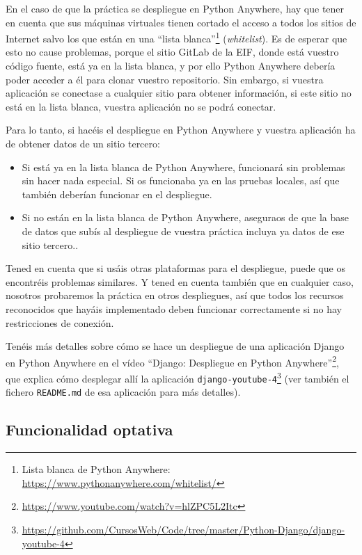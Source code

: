 En el caso de que la práctica se despliegue en Python Anywhere, hay que tener en cuenta que sus máquinas virtuales tienen cortado el acceso a todos los sitios de Internet salvo los que están en una ``lista blanca''\footnote{Lista blanca de Python Anywhere: \url{https://www.pythonanywhere.com/whitelist/}} (\emph{whitelist}). Es de esperar que esto no cause problemas, porque el sitio GitLab de la EIF, donde está vuestro código fuente, está ya en la lista blanca, y por ello Python Anywhere debería poder acceder a él para clonar vuestro repositorio. Sin embargo, si vuestra aplicación se conectase a cualquier sitio para obtener información, si este sitio no está en la lista blanca, vuestra aplicación no se podrá conectar.

Para lo tanto, si hacéis el despliegue en Python Anywhere y vuestra aplicación ha de obtener datos de un sitio tercero:

\begin{itemize}
  \item Si está ya en la lista blanca de Python Anywhere, funcionará sin problemas sin hacer nada especial. Si os funcionaba ya en las pruebas locales, así que también deberían funcionar en el despliegue.
  \item Si no están en la lista blanca de Python Anywhere, aseguraos de que la base de datos que subís al despliegue de vuestra práctica incluya ya datos de ese sitio tercero..
\end{itemize}

Tened en cuenta que si usáis otras plataformas para el despliegue, puede que os encontréis problemas similares. Y tened en cuenta también que en cualquier caso, nosotros probaremos la práctica en otros despliegues, así que todos los recursos reconocidos que hayáis implementado deben funcionar correctamente si no hay restricciones de conexión.

Tenéis más detalles sobre cómo se hace un despliegue de una aplicación Django en Python Anywhere en el vídeo ``Django: Despliegue en Python Anywhere''\footnote{\url{https://www.youtube.com/watch?v=hlZPC5L2Itc}}, que explica cómo desplegar allí la aplicación \texttt{django-youtube-4}\footnote{\url{https://github.com/CursosWeb/Code/tree/master/Python-Django/django-youtube-4}} (ver también el fichero \texttt{README.md} de esa aplicación para más detalles).

\subsection{Funcionalidad optativa}

